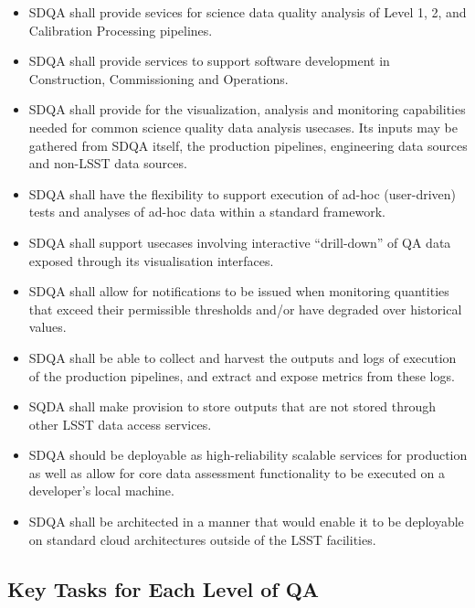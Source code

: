 \begin{itemize}
\item SDQA shall provide sevices for science data quality analysis of Level 1, 2, and Calibration Processing pipelines.

\item SDQA shall provide services to support software development in Construction, Commissioning and Operations.

\item SDQA shall provide for the visualization, analysis and monitoring capabilities needed for common science quality data analysis usecases. Its inputs may be gathered from SDQA itself, the production pipelines, engineering data sources and non-LSST data sources. 

\item SDQA shall have the flexibility to support execution of ad-hoc (user-driven) tests and analyses of ad-hoc data within a standard framework.  

\item SDQA shall support usecases involving interactive ``drill-down'' of QA data exposed through its visualisation interfaces. 

\item SDQA shall allow for notifications to be issued when monitoring quantities that exceed their permissible thresholds and/or have degraded over historical values. 

\item SDQA shall be able to collect and harvest the outputs and logs of execution of the production pipelines, and extract and expose metrics from these logs. 

\item SQDA shall make provision to store outputs that are not stored through other LSST data access services. 

\item SDQA should be deployable as high-reliability scalable services for production as well as allow for core data assessment functionality to be executed on a developer's local machine.

\item SDQA shall be architected in a manner that would enable it to be deployable on standard cloud architectures outside of the LSST facilities. 


\end{itemize}


\subsection{Key Tasks for Each Level of QA}

